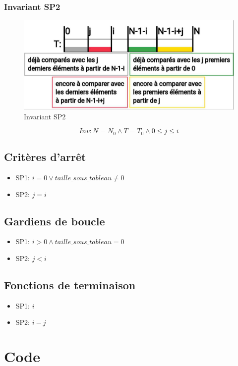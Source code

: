 \documentclass[a4paper, 11pt, oneside]{article}
\begin{document}
\subsubsection{Invariant SP2}
\begin{figure}[h]
  \centering
  \includegraphics[scale=0.4]{invariant_sp2.jpg}
  \caption{Invariant SP2}
\end{figure}

$$Inv: N=N_0\wedge T=T_0\wedge 0\leq j\leq i$$
\subsection{Critères d'arrêt}
\begin{itemize}
  \item SP1: $i=0 \vee taille\_sous\_tableau\neq 0$
  \item SP2: $j=i$
\end{itemize}
\subsection{Gardiens de boucle}
\begin{itemize}
  \item SP1: $i>0 \wedge taille\_sous\_tableau=0$
  \item SP2: $j<i$
\end{itemize}

\subsection{Fonctions de terminaison}
\begin{itemize}
  \item SP1: $i$
  \item SP2: $i-j$
\end{itemize}

\section{Code}
\end{document}
